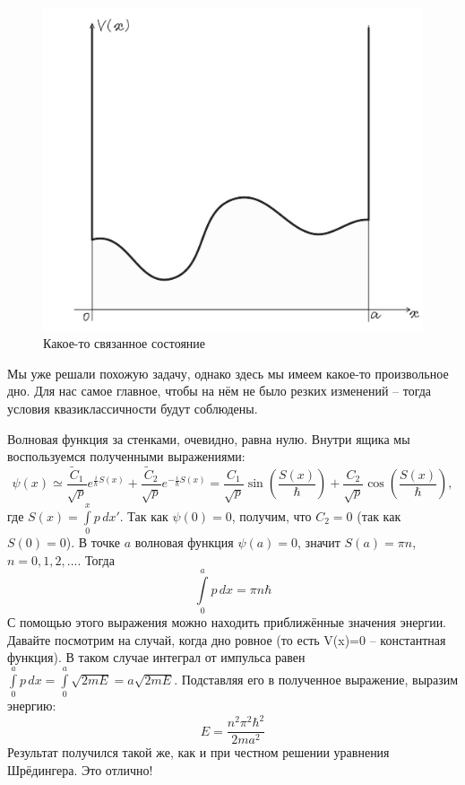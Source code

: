 \begin{figure}[ht]
\centering
\includegraphics[scale=0.2]{class_11/images/bound-state.jpg}
\caption{Какое-то связанное состояние}
\label{fig 11.1}
\end{figure}

Мы уже решали похожую задачу, однако здесь мы имеем какое-то произвольное дно. Для нас самое главное, чтобы на нём не было резких изменений -- тогда условия квазиклассичности будут соблюдены.

Волновая функция за стенками, очевидно, равна нулю. Внутри ящика мы воспользуемся полученными выражениями:
\[
\psi(x) \simeq \frac{\widetilde{C}_1}{\sqrt{p}}e^{\frac{i}{\hbar}S(x)} + \frac{\widetilde{C}_2}{\sqrt{p}}e^{-\frac{i}{\hbar}S(x)} = \frac{C_1}{\sqrt{p}}\sin (\frac{S(x)}{\hbar}) + \frac{C_2}{\sqrt{p}}\cos(\frac{S(x)}{\hbar}),
\]
где $S(x) = \int\limits_{0}^{x}p\, dx'$. Так как $\psi(0) = 0$, получим, что $C_2 = 0$ (так как $S(0) = 0$). В точке $a$ волновая функция $\psi(a) = 0$, значит $S(a) = \pi n$, $n = 0, 1, 2, ...$. Тогда
\[
\int\limits_{0}^{a}p\, dx = \pi n \hbar
\]
С помощью этого выражения можно находить приближённые значения энергии. Давайте посмотрим на случай, когда дно ровное (то есть V(x)=0 -- константная функция). В таком случае интеграл от импульса равен $\int\limits_{0}^{a}p\, dx = \int\limits_{0}^{a}\sqrt{2mE} = a\sqrt{2mE}$. Подставляя его в полученное выражение, выразим энергию:
\[
E = \frac{n^2\pi^2\hbar^2}{2ma^2}
\]
Результат получился такой же, как и при честном решении уравнения Шрёдингера. Это отлично!

